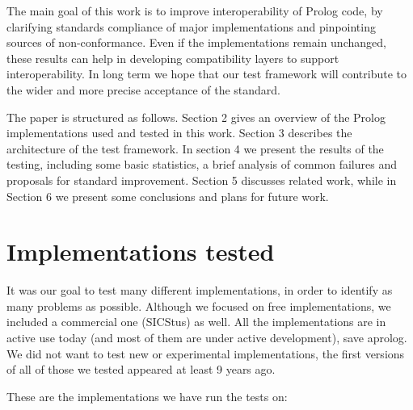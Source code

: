 \documentclass[draft]{llncs}%
\begin{document}

The main goal of this work is to improve interoperability of Prolog code, by
clarifying standards compliance of major implementations and pinpointing
sources of non-conformance. Even if the implementations remain unchanged,
these results can help in developing compatibility layers to support
interoperability. In long term we hope that our test framework will
contribute to the wider and more precise acceptance of the standard.

The paper is structured as follows. Section 2 gives an overview of the
Prolog implementations used and tested in this work. Section 3 describes the
architecture of the test framework. In section 4 we present the results of the
testing, including some basic statistics, a brief analysis of common failures
and proposals for standard improvement. Section 5 discusses related work,
while in Section 6 we present some conclusions and plans for future work.


\section{Implementations tested}

It was our goal to test many different implementations, in order to identify
as many problems as possible. Although we focused on free implementations, we
included a commercial one (SICStus) as well. All the implementations are in
active use today (and most of them are under active development), save
aprolog. We did not want to test new or experimental implementations, the
first versions of all of those we tested appeared at least 9 years ago. 

These are the implementations we have run the tests on:
\end{document}
